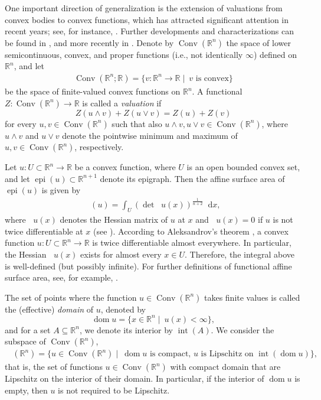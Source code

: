 \documentclass[11pt]{article}
\theoremstyle{definition} %
\newcommand{\dif}{\mathop{}\!\mathrm{d}}
\newcommand{\RR}{(\mathbb{R}^n)}
\DeclareMathOperator{\Conv}{Conv}
\DeclareMathOperator{\dom}{dom}
\DeclareMathOperator{\interior}{int}
\DeclareMathOperator{\D}{D^2}
\DeclareMathOperator{\epi}{epi}
\DeclareMathOperator{\LC}{Conv_{ld}}
\DeclareMathOperator{\fas}{\Omega_{func}}
\begin{document}
One important direction of generalization is the extension of valuations from convex bodies to convex functions, which has attracted significant attention in recent years; see, for instance, \cite{colesanti2019convex, colesanti2017minkowski, colesanti2020homogeneous, colesanti2020hessian}. 
Further developments and characterizations can be found in \cite{M1, colesanti2023hadwiger, colesanti2024hadwigerI, knoerr2021support, knoerr2024valuations}, and more recently in \cite{mouamine2025klain, mouamine2025vectorial, mouamine2025additive}.
Denote by  $\Conv(\mathbb{R}^n)$ the space of  lower semicontinuous, convex, and proper functions (i.e., not identically $\infty$) defined on $\mathbb{R}^n$, and let
\begin{align*}
\Conv(\mathbb{R}^n;\mathbb{R})= \{v:\mathbb{R}^n\to \mathbb{R}\mid \ v \text{ is convex}\}    
\end{align*}
be the space of finite-valued convex functions on $\mathbb{R}^n$. A functional $Z: \Conv(\mathbb{R}^n)\rightarrow \mathbb{R}$ is called a \textit{valuation} if
$$Z(u\wedge v)+ Z(u\vee v)= Z(u) + Z(v)$$
for every $u,v\in \Conv(\mathbb{R}^n)$ such that also $u\wedge v, u\vee v\in \Conv(\mathbb{R}^n)$, where $u\wedge v$ and $u\vee v$ denote the
pointwise  minimum and maximum of $u,v\in \Conv(\mathbb{R}^n)$, respectively.


Let $u: U\subset \mathbb{R}^n \to \mathbb{R}$ be a convex function, where $U$ is an open bounded convex set, and let
\(
\epi(u)\subset \mathbb{R}^{n+1}
\)
denote its epigraph. Then the affine surface area of $\epi(u)$ is given by
\begin{align*}
    \fas(u)=\int_U (\det \D u(x))^{\frac{1}{n+2}} \dif x,
\end{align*}
where $\D u(x)$ denotes the Hessian matrix of $u$ at $x$ and $\D u(x)=0$ if $u$ is not twice differentiable at $x$ (see \cite{trudinger2000bernstein}). According to Aleksandrov's theorem \cite{aleksandrov1939second}, a convex function
$u:U\subset\mathbb{R}^n\to\mathbb{R}$ is twice differentiable almost everywhere. In particular, the Hessian $\D u(x)$ exists for almost every $x\in U$. Therefore, the integral above is well-defined (but possibly infinite).
For further definitions of functional affine surface area, see, for example, \cite{artstein2012functional, caglar2016functional, li2019floating, schutt2025weighted}.





The set of points where the function $u\in \Conv(\mathbb{R}^n)$ takes finite values is called the (effective) \emph{domain} of $u$, denoted by 
$$
\dom u = \{ x \in \mathbb{R}^n \mid \ u(x) < \infty \},
$$  
and for a set $A \subseteq \mathbb{R}^n$, we denote its interior by $\interior(A)$.  
 We  consider the subspace of $\Conv(\mathbb{R}^n)$,
\begin{align*}
 \LC\RR=
\{u\in \Conv(\mathbb{R}^n)\mid \ \dom u \mbox{ is compact},\, u \mbox{ is Lipschitz on  $\interior(\dom u)$}\},
\end{align*}
that is, the set of functions $u \in \Conv(\mathbb{R}^n)$ with compact domain that are Lipschitz on the interior of their domain. In particular,  if the interior of $\dom u$ is empty, then $u$ is not required to be Lipschitz. 
\end{document}
